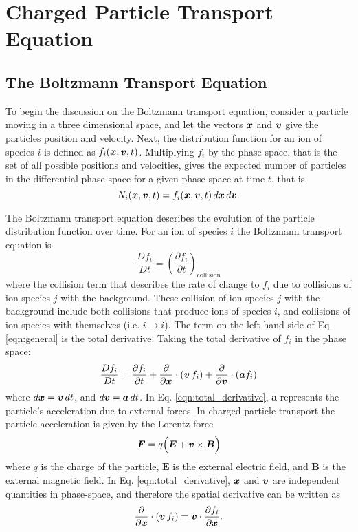 \chapter{Charged Particle Transport Equation}

\section{The Boltzmann Transport Equation}
To begin the discussion on the Boltzmann transport equation, consider a particle moving in a three dimensional space, and let the vectors $\boldsymbol{x}$ and $\boldsymbol{v}$ give the particles position and velocity. Next, the distribution function for an ion of species $i$ is defined as $f_i(\boldsymbol{x},\boldsymbol{v},t)$. Multiplying $f_i$ by the phase space, that is the set of all possible positions and velocities, gives the expected number of particles in the differential phase space for a given phase space at time $t$, that is,
\begin{equation}
  N_i(\boldsymbol{x},\boldsymbol{v},t) = f_i(\boldsymbol{x},\boldsymbol{v},t) \, d\boldsymbol{x} \, d\boldsymbol{v}.
\end{equation}

The Boltzmann transport equation describes the evolution of the particle distribution function over time. For an ion of species $i$ the Boltzmann transport equation is
\begin{equation} \label{eqn:general}
  \dfrac{D f_i}{D t} = \left( \dfrac{\partial f_i}{\partial t} \right)_{\text{collision}}
\end{equation}
where the collision term that describes the rate of change to $f_i$ due to collisions of ion species $j$ with the background. These collision of ion species $j$ with the background include both collisions that produce ions of species $i$, and collisions of ion species with themselves (i.e. $i \rightarrow i$). The term on the left-hand side of Eq. \eqref{eqn:general} is the total derivative. Taking the total derivative of $f_i$ in the phase space:
\begin{equation} \label{eqn:total_derivative}
    \dfrac{D f_i}{Dt} = \dfrac{\partial f_i}{\partial t} + \dfrac{\partial}{\partial \boldsymbol{x}} \cdot \left( \boldsymbol{v} \, f_i \right) + \dfrac{\partial}{\partial \boldsymbol{v}} \cdot \left( \boldsymbol{a} f_i \right)
\end{equation}
where $d\boldsymbol{x} = \boldsymbol{v} \, dt$, and $d\boldsymbol{v} = \boldsymbol{a} \, dt$. In Eq. \eqref{eqn:total_derivative}, $\boldsymbol{a}$ represents the particle's acceleration due to external forces. In charged particle transport the particle acceleration is given by the Lorentz force
\begin{equation} \label{eqn:lorentz}
  \boldsymbol{F} = q \Big( \boldsymbol{E} + \boldsymbol{v} \times \boldsymbol{B} \Big)
\end{equation}
where $q$ is the charge of the particle, $\boldsymbol{E}$ is the external electric field, and $\boldsymbol{B}$ is the external magnetic field. In Eq. \eqref{eqn:total_derivative}, $\boldsymbol{x}$ and $\boldsymbol{v}$ are independent quantities in phase-space, and therefore the spatial derivative can be written as
\begin{equation} \label{eqn:spatial_derivative}
  \dfrac{\partial}{\partial \boldsymbol{x}} \cdot \left( \boldsymbol{v} \, f_i \right) = \boldsymbol{v} \cdot \dfrac{\partial f_i}{\partial \boldsymbol{x}}.
\end{equation}


